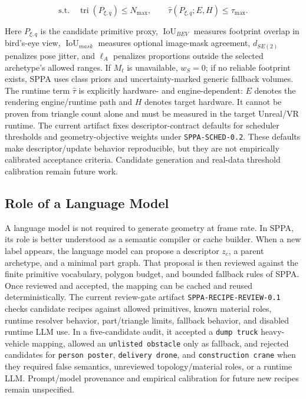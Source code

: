 ﻿\documentclass[11pt,a4paper]{article}
\begin{document}
\[
\text{s.t.}\quad
\operatorname{tri}(P_{\xi,q}) \leq N_{\max},
\qquad
\widehat{\tau}(P_{\xi,q};E,H) \leq \tau_{\max}.
\]

Here \(P_{\xi,q}\) is the candidate primitive proxy, \(\operatorname{IoU}_{BEV}\)
measures footprint overlap in bird's-eye view, \(\operatorname{IoU}_{mask}\)
measures optional image-mask agreement, \(d_{SE(2)}\) penalizes pose jitter, and
\(\ell_A\) penalizes proportions outside the selected archetype's allowed
ranges. If \(M_t\) is unavailable, \(w_S=0\); if no reliable footprint exists,
SPPA uses class priors and uncertainty-marked generic fallback volumes. The runtime term
\(\widehat{\tau}\) is explicitly hardware- and engine-dependent: \(E\) denotes
the rendering engine/runtime path and \(H\) denotes target hardware. It cannot
be proven from triangle count alone and must be measured in the target
Unreal/VR runtime. The current artifact fixes descriptor-contract
defaults for scheduler thresholds and geometry-objective weights under
\texttt{SPPA-SCHED-0.2}. These defaults make descriptor/update behavior
reproducible, but they are not empirically calibrated acceptance criteria.
Candidate generation and real-data threshold calibration remain future work.

\subsection{Role of a Language Model}

A language model is not required to generate geometry at frame rate. In SPPA,
its role is better understood as a semantic compiler or cache builder. When a
new label appears, the language model can propose a descriptor \(z_c\), a parent
archetype, and a minimal part graph. That proposal is then reviewed against the
finite primitive vocabulary, polygon budget, and bounded fallback rules of
SPPA. Once reviewed and accepted, the mapping can be cached and reused
deterministically. The current review-gate artifact
\texttt{SPPA-RECIPE-REVIEW-0.1} checks candidate recipes against allowed
primitives, known material roles, runtime resolver behavior, part/triangle
limits, fallback behavior, and disabled runtime LLM use. In a five-candidate
audit, it accepted a \texttt{dump truck} heavy-vehicle mapping, allowed an
\texttt{unlisted obstacle} only as fallback, and rejected candidates for
\texttt{person poster}, \texttt{delivery drone}, and \texttt{construction crane}
when they required false semantics, unreviewed topology/material roles, or a
runtime LLM. Prompt/model provenance and empirical calibration for future new
recipes remain unspecified.
\end{document}
